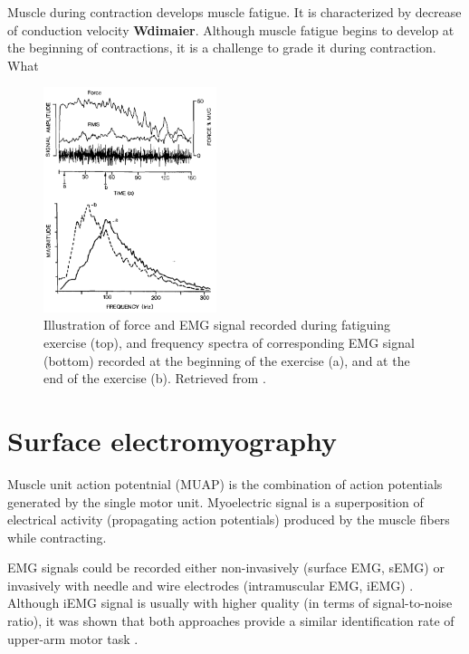 Muscle during contraction develops muscle fatigue. It is characterized by decrease of conduction velocity \textbf{Wdimaier}. Although muscle fatigue begins to develop at the beginning of contractions, it is a challenge to grade it during contraction. What   

\begin{figure}[ht]
\centering
\includegraphics[width=0.45\textwidth]{Images/introduction/fatigue.png}
\caption{Illustration of force and EMG signal recorded during fatiguing exercise (top), and frequency spectra of corresponding EMG signal (bottom) recorded at the beginning of the exercise (a), and at the end of the exercise (b). Retrieved from \citep{DeLuca1984}.}
\label{fig:fatigue}
\end{figure}

\section{Surface electromyography}

Muscle unit action potentnial (MUAP) is the combination of action potentials generated by the single motor unit.
Myoelectric signal is a superposition of electrical activity (propagating action potentials) produced by the muscle fibers while contracting. 

EMG signals could be recorded either non-invasively (surface EMG, sEMG) or invasively with needle and wire electrodes (intramuscular EMG, iEMG) \citep{Marateb1999}. Although iEMG signal is usually with higher quality (in terms of signal-to-noise ratio), it was shown that both approaches provide a similar identification rate of upper-arm motor task \citep{Hargrove2007}.

